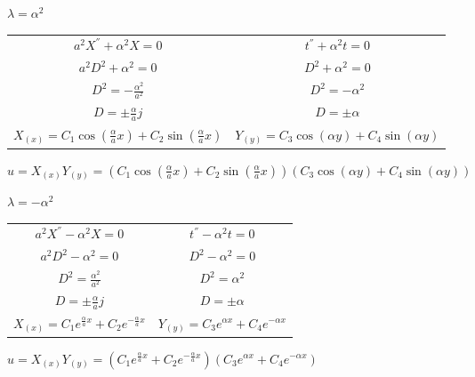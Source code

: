 \documentclass[10pt,a4paper]{article}
\begin{document}
\begin{enumerate}
\begin{center}
$\lambda=\alpha^2$
\end{center}

\begin{center}
\begin{tabular}{c c} 
 
$a^2{ X }^{ '' }+{\alpha}^2X=0$ & ${ t }^{ '' }+{\alpha}^2t=0$   \\ 
$a^2D^2+{\alpha}^2=0$                      & $D^2+{\alpha}^2=0$  \\ 
$D^2=-\frac{{\alpha}^{ 2 }}{a^2}$ & $D^2=-{\alpha}^2$  \\ 
$D= \pm \frac{\alpha}{a}j$ & $D=\pm \alpha$  \\ 
$X_{(x)}=C_1\cos(\frac{\alpha}{a} x)+C_2 \sin(\frac{\alpha}{a} x)$ & $Y_{(y)}=C_3\cos(\alpha y)+C_4\sin(\alpha y)$  \\
\end{tabular}
\end{center}
$u=X_{(x)} Y_{(y)}=(C_1\cos(\frac{\alpha}{a} x)+C_2 \sin(\frac{\alpha}{a} x))(C_3\cos(\alpha y)+C_4\sin(\alpha y))$


\begin{center}
$\lambda=-\alpha^2$
\end{center}

\begin{center}
\begin{tabular}{c c} 
 
$a^2{ X }^{ '' }-{\alpha}^2X=0$ & ${ t }^{ '' }-{\alpha}^2t=0$   \\ 
$a^2D^2-{\alpha}^2=0$                      & $D^2-{\alpha}^2=0$  \\ 
$D^2=\frac{{\alpha}^{ 2 }}{a^2}$ & $D^2={\alpha}^2$  \\ 
$D=\pm \frac{\alpha}{a}j$ & $D=\pm \alpha$  \\ 
$X_{(x)}=C_1 e^{\frac{\alpha}{a} x} +C_2 e^{-\frac{\alpha}{a} x}$ & $Y_{(y)}=C_3e^{\alpha x}+C_4e^{-\alpha x}$  \\

\end{tabular}
\end{center}
$u=X_{(x)} Y_{(y)}=(C_1 e^{\frac{\alpha}{a} x} +C_2 e^{-\frac{\alpha}{a} x})(C_3e^{\alpha x}+C_4e^{-\alpha x})$

\end{enumerate}
\end{document}
